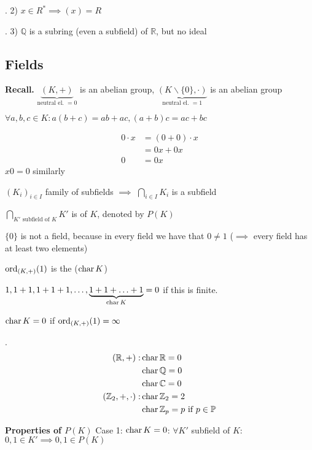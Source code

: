 \Example.
2) $x\in R^{*} \implies (x) = R$

\Example.
3) $\mathbb{Q}$ is a subring (even a subfield) of $\mathbb{R}$, but no ideal

\subsection{Fields}

\textbf{Recall.}
$\underbrace{(K,+)}_{\text{neutral el. }= 0}$ is an abelian group, $\underbrace{(K\backslash \{0\}, \cdot)}_{\text{neutral el. }= 1}$ is an abelian group

$\forall a,b,c \in K: a(b+c) = ab+ac, (a+b)c = ac+bc$

\begin{align*}
  0\cdot x &= (0+0) \cdot x \\
           &= 0x + 0x \\
         0 &= 0x
\end{align*}
$x0 = 0$ similarly

$(K_i)_{i\in I}$ family of subfields $\implies$ $\bigcap_{i\in I} K_i$ is a subfield

\begin{definition}
  $\bigcap_{K' \text{ subfield of $K$}} K'$ is  of $K$, denoted by $P(K)$
\end{definition}

$\{0\}$ is not a field, because in every field we have that $0 \neq 1$ ($\implies$ every field has at least two elements)

\begin{definition}
  $\operatorname{ord}_{(K,+)} (1)$ is the  ($\operatorname{char} K$)
\end{definition}

$1,1+1, 1+1+1, \ldots, \underbrace{1+1+ \ldots +1}_{\operatorname{char} K} = 0$ if this is finite.

$\operatorname{char} K = 0$ if $\operatorname{ord}_{(K,+)} (1) = \infty$

\Example.
\begin{align*}
  (\mathbb{R}, +): &\operatorname{char} \mathbb{R} = 0\\
  &\operatorname{char} \mathbb{Q} = 0\\
  &\operatorname{char} \mathbb{C} = 0\\
  (\mathbb{Z}_2, +, \cdot): &\operatorname{char} \mathbb{Z}_2 = 2\\
  &\operatorname{char} \mathbb{Z}_p = p \text{ if } p \in \mathbb{P}
\end{align*}

\textbf{Properties of $P(K)$}
Case 1:
$\operatorname{char} K=0$:
$\forall K'$ subfield of $K$: $0,1 \in K' \implies 0,1 \in P(K)$


